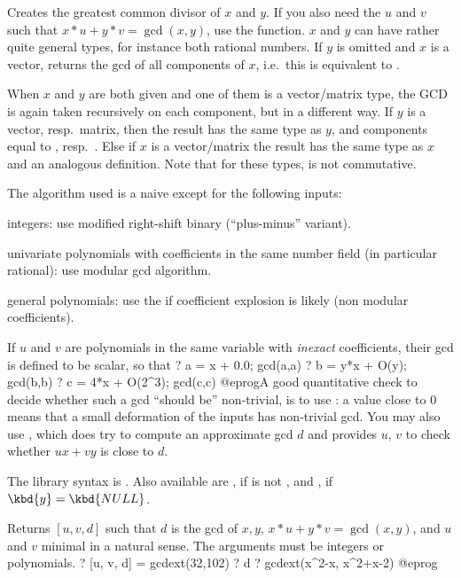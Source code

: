 \label{se:gcd}
Creates the greatest common divisor of $x$ and $y$.
If you also need the $u$ and $v$ such that $x*u + y*v = \gcd(x,y)$,
use the  function. $x$ and $y$ can have rather quite general
types, for instance both rational numbers. If $y$ is omitted and $x$ is a
vector, returns the $\text{gcd}$ of all components of $x$, i.e.~this is
equivalent to .

When $x$ and $y$ are both given and one of them is a vector/matrix type,
the GCD is again taken recursively on each component, but in a different way.
If $y$ is a vector, resp.~matrix, then the result has the same type as $y$,
and components equal to , resp.~. Else
if $x$ is a vector/matrix the result has the same type as $x$ and an
analogous definition. Note that for these types,  is not
commutative.

The algorithm used is a naive  except for the following inputs:

\item integers: use modified right-shift binary (``plus-minus''
variant).

\item univariate polynomials with coefficients in the same number
field (in particular rational): use modular gcd algorithm.

\item general polynomials: use the  if
coefficient explosion is likely (non modular coefficients).

If $u$ and $v$ are polynomials in the same variable with \emph{inexact}
coefficients, their gcd is defined to be scalar, so that
\bprog
? a = x + 0.0; gcd(a,a)
? b = y*x + O(y); gcd(b,b)
? c = 4*x + O(2^3); gcd(c,c)
@eprog\noindent A good quantitative check to decide whether such a
gcd ``should be'' non-trivial, is to use : a value
close to $0$ means that a small deformation of the inputs has non-trivial gcd.
You may also use , which does try to compute an approximate gcd
$d$ and provides $u$, $v$ to check whether $u x + v y$ is close to $d$.

The library syntax is .
Also available are , if  is not
, and , if $\kbd{y} = \kbd{NULL}$.

\label{se:gcdext}
Returns $[u,v,d]$ such that $d$ is the gcd of $x,y$,
$x*u+y*v=\gcd(x,y)$, and $u$ and $v$ minimal in a natural sense.
The arguments must be integers or polynomials. 
\bprog
? [u, v, d] = gcdext(32,102)
? d
? gcdext(x^2-x, x^2+x-2)
@eprog

